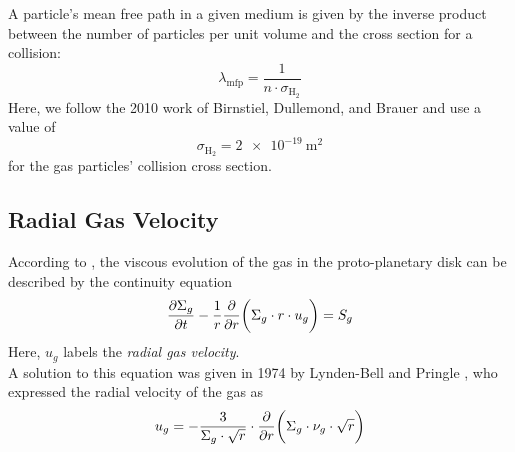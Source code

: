         A particle's mean free path in a given medium is given by the inverse product between the 
        number of particles per unit volume and the cross section for a collision:
        \begin{equation}
            \lambda_\text{mfp} = \frac{1}{n \cdot \sigma_{\text{H}_2}}
        \end{equation}
        Here, we follow the 2010 work of Birnstiel, Dullemond, and
        Brauer \cite{birnstiel_dullemond_brauer_2010} and use a value of
        \begin{equation}
            \sigma_{\text{H}_2} = \SI{2e-19}{\meter^2}
        \end{equation}
        for the gas particles' collision cross section. \\


    \subsection{Radial Gas Velocity}


        According to \cite{birnstiel_dullemond_brauer_2010},
        the viscous evolution of the gas in the proto-planetary disk can be described by the 
        continuity equation 
        \begin{equation}
            \frac{\partial \Sigma_g}{\partial t}-\frac{1}{r}\frac{\partial }{\partial r}\bigg(\Sigma_g \cdot r \cdot u_g\bigg) = S_g
        \end{equation}
        Here, $u_g$ labels the \textit{radial gas velocity}.
        \\

        A solution to this equation was given in 1974 by Lynden-Bell and Pringle 
        \cite{lynden-bell_pringle_1974}, who expressed the radial velocity of the gas as
        \begin{equation}
            \label{eq:radial_gas_velocity}
            u_{g}
            =-\frac{3}{\Sigma_g\cdot\sqrt{r}}
                \cdot\frac{\partial }{\partial r}\bigg(\Sigma_g \cdot \nu_g \cdot \sqrt{r}\bigg)
        \end{equation}

